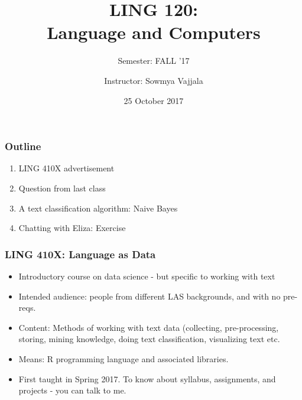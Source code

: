 \documentclass{beamer}
\author[Sowmya Vajjala]{Instructor: Sowmya Vajjala}
\title[LING 120]{LING 120: \\ Language and Computers}
\subtitle{Semester: FALL '17}
\date{25 October 2017}
\institute{Iowa State University, USA}
\begin{document}
\begin{frame}\titlepage
\end{frame}
\begin{frame}
\frametitle{Outline}
\begin{enumerate}
\item LING 410X advertisement 
\item Question from last class
\item A text classification algorithm: Naive Bayes
\item Chatting with Eliza: Exercise
\end{enumerate}
\end{frame}

\begin{frame}
\frametitle{LING 410X: Language as Data}
\begin{itemize}
\item Introductory course on data science - but specific to working with text
\item Intended audience: people from different LAS backgrounds, and with no pre-reqs.
\item Content: Methods of working with text data (collecting, pre-processing, storing, mining knowledge, doing text classification, visualizing text etc.
\item Means: R programming language and associated libraries.
\item First taught in Spring 2017. To know about syllabus, assignments, and projects - you can talk to me. 
\end{itemize}
\end{frame}
\end{document}
